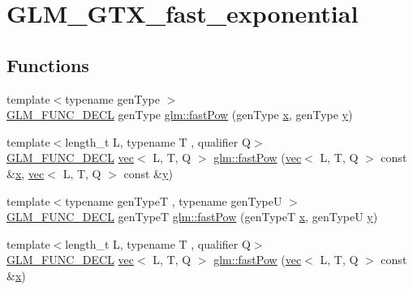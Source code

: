 \hypertarget{group__gtx__fast__exponential}{}\section{G\+L\+M\+\_\+\+G\+T\+X\+\_\+fast\+\_\+exponential}
\label{group__gtx__fast__exponential}
\subsection*{Functions}
\begin{DoxyCompactItemize}
\item 
{\footnotesize template$<$typename gen\+Type $>$ }\\\mbox{\hyperlink{setup_8hpp_ab2d052de21a70539923e9bcbf6e83a51}{G\+L\+M\+\_\+\+F\+U\+N\+C\+\_\+\+D\+E\+CL}} gen\+Type \mbox{\hyperlink{group__gtx__fast__exponential_ga5340e98a11fcbbd936ba6e983a154d50}{glm\+::fast\+Pow}} (gen\+Type \mbox{\hyperlink{_s_d_l__opengl_8h_ad0e63d0edcdbd3d79554076bf309fd47}{x}}, gen\+Type \mbox{\hyperlink{_s_d_l__opengl_8h_a1675d9d7bb68e1657ff028643b4037e3}{y}})
\item 
{\footnotesize template$<$length\+\_\+t L, typename T , qualifier Q$>$ }\\\mbox{\hyperlink{setup_8hpp_ab2d052de21a70539923e9bcbf6e83a51}{G\+L\+M\+\_\+\+F\+U\+N\+C\+\_\+\+D\+E\+CL}} \mbox{\hyperlink{structglm_1_1vec}{vec}}$<$ L, T, Q $>$ \mbox{\hyperlink{group__gtx__fast__exponential_ga15325a8ed2d1c4ed2412c4b3b3927aa2}{glm\+::fast\+Pow}} (\mbox{\hyperlink{structglm_1_1vec}{vec}}$<$ L, T, Q $>$ const \&\mbox{\hyperlink{_s_d_l__opengl_8h_ad0e63d0edcdbd3d79554076bf309fd47}{x}}, \mbox{\hyperlink{structglm_1_1vec}{vec}}$<$ L, T, Q $>$ const \&\mbox{\hyperlink{_s_d_l__opengl_8h_a1675d9d7bb68e1657ff028643b4037e3}{y}})
\item 
{\footnotesize template$<$typename gen\+TypeT , typename gen\+TypeU $>$ }\\\mbox{\hyperlink{setup_8hpp_ab2d052de21a70539923e9bcbf6e83a51}{G\+L\+M\+\_\+\+F\+U\+N\+C\+\_\+\+D\+E\+CL}} gen\+TypeT \mbox{\hyperlink{group__gtx__fast__exponential_ga7f2562db9c3e02ae76169c36b086c3f6}{glm\+::fast\+Pow}} (gen\+TypeT \mbox{\hyperlink{_s_d_l__opengl_8h_ad0e63d0edcdbd3d79554076bf309fd47}{x}}, gen\+TypeU \mbox{\hyperlink{_s_d_l__opengl_8h_a1675d9d7bb68e1657ff028643b4037e3}{y}})
\item 
{\footnotesize template$<$length\+\_\+t L, typename T , qualifier Q$>$ }\\\mbox{\hyperlink{setup_8hpp_ab2d052de21a70539923e9bcbf6e83a51}{G\+L\+M\+\_\+\+F\+U\+N\+C\+\_\+\+D\+E\+CL}} \mbox{\hyperlink{structglm_1_1vec}{vec}}$<$ L, T, Q $>$ \mbox{\hyperlink{group__gtx__fast__exponential_ga1abe488c0829da5b9de70ac64aeaa7e5}{glm\+::fast\+Pow}} (\mbox{\hyperlink{structglm_1_1vec}{vec}}$<$ L, T, Q $>$ const \&\mbox{\hyperlink{_s_d_l__opengl_8h_ad0e63d0edcdbd3d79554076bf309fd47}{x}})

\end{DoxyCompactItemize}
